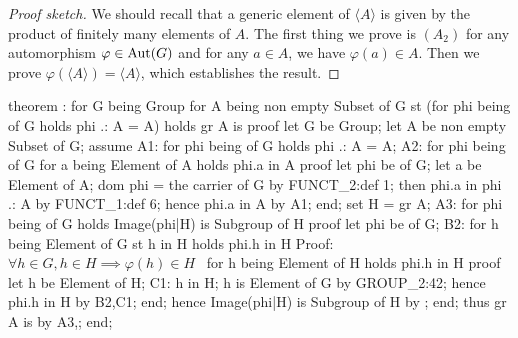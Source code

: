 \begin{proof}[Proof sketch]
We should recall that a generic element of $\langle A\rangle$ is given
by the product of finitely many elements of $A$. The first thing we
prove is $(A_{2})$ for any automorphism $\varphi\in\operatorname{Aut}(G)$ and for any
$a\in A$, we have $\varphi(a)\in A$. Then we prove
$\varphi(\langle A\rangle)=\langle A\rangle$, which establishes the result.
\end{proof}

\nwenddocs{}\endmoddef\nwstartdeflinemarkup{}\nwenddeflinemarkup
theorem :
  for G being Group
  for A being non empty Subset of G
  st (for phi being  of G
      holds phi .: A = A)
  holds gr A is 
proof
  let G be Group;
  let A be non empty Subset of G;
  assume A1: for phi being  of G holds phi .: A = A;
  A2: for phi being  of G for a being Element of A holds phi.a in A
  proof
    let phi be  of G;
    let a be Element of A;
    dom phi = the carrier of G by FUNCT_2:def 1;
    then phi.a in phi .: A by FUNCT_1:def 6;
    hence phi.a in A by A1;
  end;
  set H = gr A;
  A3: for phi being  of G holds Image(phi|H) is Subgroup of H
  proof
    let phi be  of G;
    B2: for h being Element of G st h in H holds phi.h in H
    \LA{}Proof: $\forall h\in G, h\in H\implies \varphi(h)\in H$~{\nwtagstyle{}}\RA{}
    for h being Element of H holds phi.h in H
    proof
      let h be Element of H;
      C1: h in H;
      h is Element of G by GROUP_2:42;
      hence phi.h in H by B2,C1;
    end;
    hence Image(phi|H) is Subgroup of H by ;
  end;
  thus gr A is  by A3,;
end;
\eatline
{}\nwendcode{}\nwdocspar

